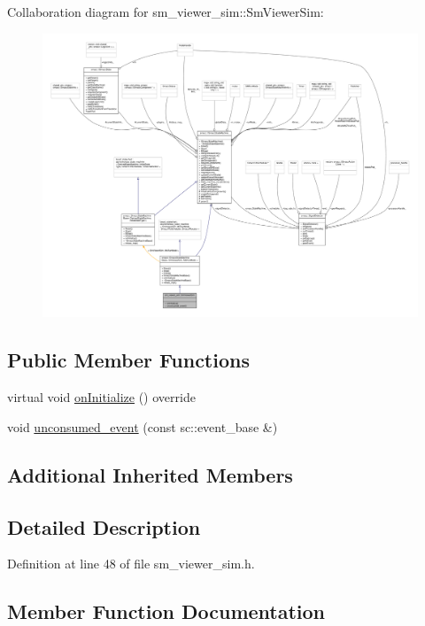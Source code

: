 Collaboration diagram for sm\+\_\+viewer\+\_\+sim\+:\+:Sm\+Viewer\+Sim\+:
\nopagebreak
\begin{figure}[H]
\begin{center}
\leavevmode
\includegraphics[width=350pt]{structsm__viewer__sim_1_1SmViewerSim__coll__graph}
\end{center}
\end{figure}
\subsection*{Public Member Functions}
\begin{DoxyCompactItemize}
\item 
virtual void \hyperlink{structsm__viewer__sim_1_1SmViewerSim_a1ad4e963a078af53a55097c6eb78cae0}{on\+Initialize} () override
\item 
void \hyperlink{structsm__viewer__sim_1_1SmViewerSim_a7b9ef19f73db25f93b1b540eb744365b}{unconsumed\+\_\+event} (const sc\+::event\+\_\+base \&)
\end{DoxyCompactItemize}
\subsection*{Additional Inherited Members}


\subsection{Detailed Description}


Definition at line 48 of file sm\+\_\+viewer\+\_\+sim.\+h.



\subsection{Member Function Documentation}
